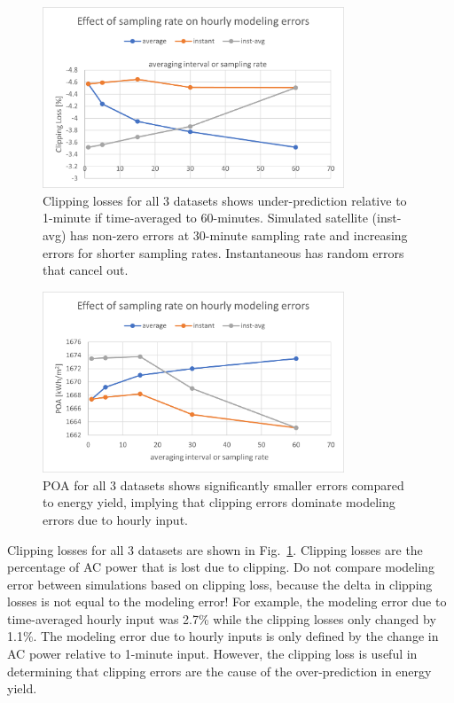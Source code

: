\documentclass[conference]{IEEEtran}
\begin{document}
\begin{figure}[htbp]
\centerline{\includegraphics[width=9cm]{NIST_clipping_loss.png}}
\caption{Clipping losses for all 3 datasets shows under-prediction relative to 1-minute if time-averaged to 60-minutes. Simulated satellite (inst-avg) has non-zero errors at 30-minute sampling rate and increasing errors for shorter sampling rates. Instantaneous has random errors that cancel out.}
\label{fig:NIST-clipping-loss}
\end{figure}

\begin{figure}[htbp]
\centerline{\includegraphics[width=9cm]{NIST_POA.png}}
\caption{POA for all 3 datasets shows significantly smaller errors compared to energy yield, implying that clipping errors dominate modeling errors due to hourly input.}
\label{fig:NIST-POA}
\end{figure}

Clipping losses for all 3 datasets are shown in Fig.~\ref{fig:NIST-clipping-loss}. Clipping losses are the percentage of AC power that is lost due to clipping. Do not compare modeling error between simulations based on clipping loss, because the delta in clipping losses is not equal to the modeling error! For example, the modeling error due to time-averaged hourly input was 2.7\% while the clipping losses only changed by 1.1\%. The modeling error due to hourly inputs is only defined by the change in AC power relative to 1-minute input. However, the clipping loss is useful in determining that clipping errors are the cause of the over-prediction in energy yield.
\end{document}
